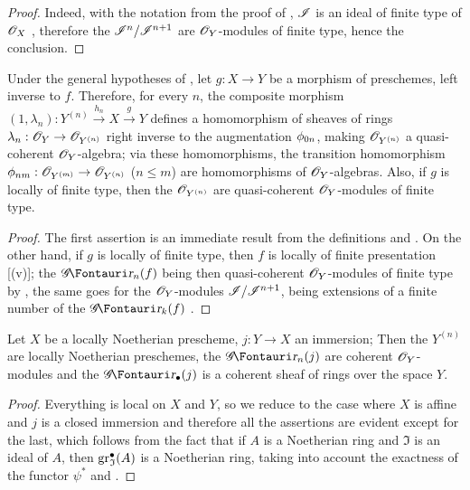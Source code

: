 \begin{proof}
Indeed, with the notation from the proof of , $\mathscr{I}$ is an ideal of finite type of $\mathscr{O}_X$ , therefore the $\mathscr{I}^n/\mathscr{I}^{n+1}$ are $\mathscr{O}_Y$-modules of finite type, hence the conclusion.
\end{proof}

\begin{corollary}[16.1.7]
\label{IV.16.1.7}
Under the general hypotheses of , let $g:X \to Y$ be a morphism of preschemes, left inverse to $f$.
Therefore, for every $n$, the composite morphism $(1, \lambda_n): Y^{(n)}\xrightarrow{h_n} X \xrightarrow{g} Y$ defines a homomorphism of sheaves of rings $\lambda_n: \sh{O}_Y \to \sh{O}_{Y^{(n)}}$ right inverse to the augmentation $\phi_{0n}$, making $\mathscr{O}_{Y^{(n)}}$ a quasi-coherent $\mathscr{O}_Y$-algebra;
via these homomorphisms, the transition homomorphism $\vphi_{nm}:\sh{O}_{Y^{(m)}} \to \sh{O}_{Y^{(n)}}$ ($n\leq m$) are homomorphisms of $\mathscr{O}_Y$-algebras. 
Also, if $g$ is locally of finite type, then the $\mathscr{O}_{Y^{(n)}}$ are quasi-coherent $\mathscr{O}_Y$-modules of finite type.
\end{corollary}

\begin{proof}
The first assertion is an immediate result from the definitions and .
On the other hand, if $g$ is locally of finite type, then $f$ is locally of finite presentation [(v)];
the $\shGr_n(f)$ being then quasi-coherent $\mathscr{O}_Y$-modules of finite type by , the same goes for the $\mathscr{O}_Y$-modules $\mathscr{I}/\mathscr{I}^{n+1}$, being extensions of a finite number of the $\shGr_k(f)$ .
\end{proof}

\begin{proposition}[16.1.8]
\label{IV.16.1.8}
Let $X$ be a locally Noetherian prescheme, $j:Y \to X$ an immersion;
Then the $Y^{(n)}$ are locally Noetherian preschemes, the $\shGr_n(j)$ are coherent $\mathscr{O}_Y$-modules and the $\shGr_\bullet(j)$ is a coherent sheaf of rings over the space $Y$.
\end{proposition}

\begin{proof}
Everything is local on $X$ and $Y$, so we reduce to the case where $X$ is affine and $j$ is a closed immersion and therefore all the assertions are evident except for the last, which follows from the fact that if $A$ is a Noetherian ring and $\mathfrak{I}$ is an ideal of $A$, then $\operatorname{gr}_\mathfrak{I}^\bullet(A)$ is a Noetherian ring, taking into account the exactness of the functor $\psi^*$ and .
\end{proof}

